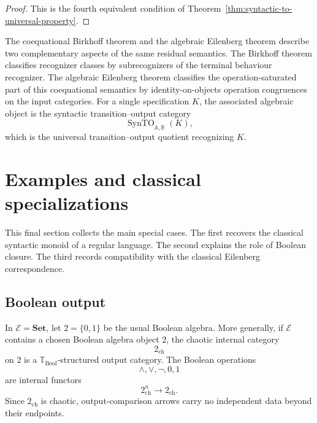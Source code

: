 \begin{proof}
    This is the fourth equivalent condition of
    Theorem~\ref{thm:syntactic-to-universal-property}.
\end{proof}

The coequational Birkhoff theorem and the algebraic Eilenberg theorem describe
two complementary aspects of the same residual semantics. The Birkhoff theorem
classifies recognizer classes by subrecognizers of the terminal behaviour
recognizer. The algebraic Eilenberg theorem classifies the operation-saturated
part of this coequational semantics by identity-on-objects operation
congruences on the input categories. For a single specification \(K\), the
associated algebraic object is the syntactic transition--output category
\[
    \operatorname{SynTO}_{\mathbb A,\mathbb B}(K),
\]
which is the universal transition--output quotient recognizing \(K\).

\section{Examples and classical specializations}
\label{sec:coeq-examples-classical-specializations}

This final section collects the main special cases. The first recovers the
classical syntactic monoid of a regular language. The second explains the role
of Boolean closure. The third records compatibility with the classical
Eilenberg correspondence.

\subsection{Boolean output}
\label{subsec:boolean-output-example}

\begin{example}
\label{ex:boolean-output-theory}
    In \(\mathcal E=\mathbf{Set}\), let \(2=\{0,1\}\) be the usual Boolean
    algebra. More generally, if \(\mathcal E\) contains a chosen Boolean algebra
    object \(2\), the chaotic internal category
    \[
        2_{\mathrm{ch}}
    \]
    on \(2\) is a \(\mathbb T_{\mathrm{Bool}}\)-structured output category. The
    Boolean operations
    \[
        \wedge,\vee,\neg,0,1
    \]
    are internal functors
    \[
        2_{\mathrm{ch}}^n\to 2_{\mathrm{ch}}.
    \]
    Since \(2_{\mathrm{ch}}\) is chaotic, output-comparison arrows carry no
    independent data beyond their endpoints.
\end{example}

